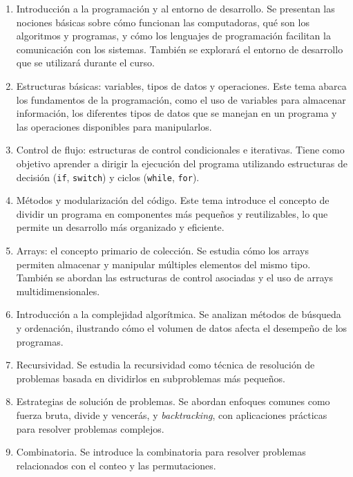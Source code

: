 \documentclass{article}
\begin{document}
\begin{enumerate}  
    \item Introducción a la programación y al entorno de desarrollo.  
    Se presentan las nociones básicas sobre cómo funcionan las computadoras, qué son los algoritmos y programas, y cómo los lenguajes de programación facilitan la comunicación con los sistemas. También se explorará el entorno de desarrollo que se utilizará durante el curso.  

    \item Estructuras básicas: variables, tipos de datos y operaciones.
    Este tema abarca los fundamentos de la programación, como el uso de variables para almacenar información, los diferentes tipos de datos que se manejan en un programa y las operaciones disponibles para manipularlos.  

    \item Control de flujo: estructuras de control condicionales e iterativas. 
    Tiene como objetivo aprender a dirigir la ejecución del programa utilizando estructuras de decisión (\texttt{if}, \texttt{switch}) y ciclos (\texttt{while}, \texttt{for}).

    \item Métodos y modularización del código.
    Este tema introduce el concepto de dividir un programa en componentes más pequeños y reutilizables, lo que permite un desarrollo más organizado y eficiente.  

    \item Arrays: el concepto primario de colección.
    Se estudia cómo los arrays permiten almacenar y manipular múltiples elementos del mismo tipo. También se abordan las estructuras de control asociadas y el uso de arrays multidimensionales.

    \item Introducción a la complejidad algorítmica.
    Se analizan métodos de búsqueda y ordenación, ilustrando cómo el volumen de datos afecta el desempeño de los programas.  

    \item Recursividad.
    Se estudia la recursividad como técnica de resolución de problemas basada en dividirlos en subproblemas más pequeños.

    \item Estrategias de solución de problemas.
    Se abordan enfoques comunes como fuerza bruta, divide y vencerás, y \textit{backtracking}, con aplicaciones prácticas para resolver problemas complejos.  

    \item Combinatoria.
    Se introduce la combinatoria para resolver problemas relacionados con el conteo y las permutaciones. 


\end{enumerate}
\end{document}
